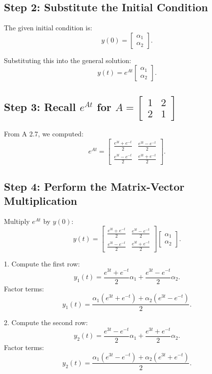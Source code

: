 \documentclass[12pt]{article}
\begin{document}
\subsection*{Step 2: Substitute the Initial Condition}

The given initial condition is:
\[
y(0) = \begin{bmatrix} \alpha_1 \\ \alpha_2 \end{bmatrix}.
\]

Substituting this into the general solution:
\[
y(t) = e^{At} \begin{bmatrix} \alpha_1 \\ \alpha_2 \end{bmatrix}.
\]

\subsection*{Step 3: Recall \(e^{At}\) for \(A = \begin{bmatrix} 1 & 2 \\ 2 & 1 \end{bmatrix}\)}

From A 2.7, we computed:
\[
e^{At} = \begin{bmatrix} 
\frac{e^{3t} + e^{-t}}{2} & \frac{e^{3t} - e^{-t}}{2} \\
\frac{e^{3t} - e^{-t}}{2} & \frac{e^{3t} + e^{-t}}{2}
\end{bmatrix}.
\]

\subsection*{Step 4: Perform the Matrix-Vector Multiplication}

Multiply \(e^{At}\) by \(y(0)\):
\[
y(t) = \begin{bmatrix} 
\frac{e^{3t} + e^{-t}}{2} & \frac{e^{3t} - e^{-t}}{2} \\
\frac{e^{3t} - e^{-t}}{2} & \frac{e^{3t} + e^{-t}}{2}
\end{bmatrix} 
\begin{bmatrix} \alpha_1 \\ \alpha_2 \end{bmatrix}.
\]

1. Compute the first row:
\[
y_1(t) = \frac{e^{3t} + e^{-t}}{2} \alpha_1 + \frac{e^{3t} - e^{-t}}{2} \alpha_2.
\]
Factor terms:
\[
y_1(t) = \frac{\alpha_1 (e^{3t} + e^{-t}) + \alpha_2 (e^{3t} - e^{-t})}{2}.
\]

2. Compute the second row:
\[
y_2(t) = \frac{e^{3t} - e^{-t}}{2} \alpha_1 + \frac{e^{3t} + e^{-t}}{2} \alpha_2.
\]
Factor terms:
\[
y_2(t) = \frac{\alpha_1 (e^{3t} - e^{-t}) + \alpha_2 (e^{3t} + e^{-t})}{2}.
\]
\end{document}
